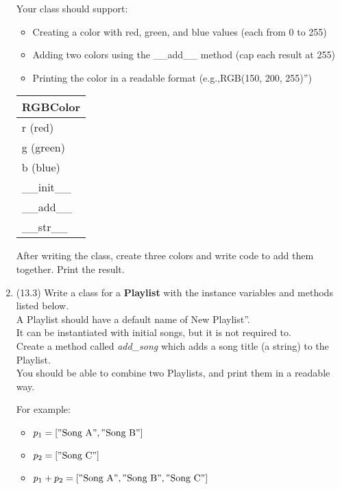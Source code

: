 \documentclass{article}
\newcommand{\csq}[1]{\reflectbox{''}#1''}  %
\newcommand{\csqt}[1]{\text{\reflectbox{''}#1''}}  %
\begin{document}
\begin{enumerate}
\begin{minipage}[t]{0.7\textwidth}
			Your class should support:
			\begin{itemize}
				\item Creating a color with red, green, and blue values (each from 0 to 255)
				\item Adding two colors using the \_\_add\_\_ method (cap each result at 255)
				\item Printing the color in a readable format (e.g.,\csq{RGB(150, 200, 255)})
			\end{itemize}
		\end{minipage}
		\hfill
		\begin{minipage}[t]{0.25\textwidth}
			\vspace{.2em}
			\begin{flushright}
				\begin{tabular}{|l|}
					\hline
					RGBColor \\ \hline
					r (red) \\
					g (green) \\
					b (blue) \\ \hline
					\_\_init\_\_ \\
					\_\_add\_\_ \\
					\_\_str\_\_ \\ \hline
				\end{tabular}
			\end{flushright}
		\end{minipage}
		
		After writing the class, create three colors and write code to add them together.
		Print the result.

	

\item (13.3) %
		Write a class for a \textbf{Playlist} with the instance variables and methods listed 
		below.\\
		A Playlist should have a default name of \csq{New Playlist}.\\
		It can be instantiated with initial songs, but it is not required to.\\
		Create a method called \textit{add\_song} which adds a song title (a string) to the 
		Playlist.\\
		You should be able to combine two Playlists, and print them in a readable way.
			
		\begin{minipage}[t]{0.65\textwidth}
			For example:
			\begin{itemize}
				\item $p_1 = [\csqt{Song A}, \csqt{Song B}]$
				\item $p_2 = [\csqt{Song C}]$
				\item $p_1 + p_2 = [\csqt{Song A}, \csqt{Song B}, \csqt{Song C}]$
			\end{itemize}


\end{minipage}
\end{enumerate}
\end{document}
